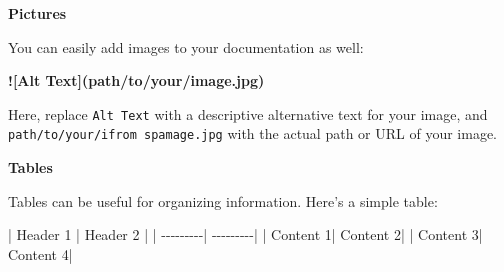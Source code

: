 \documentclass[
  letterpaper,
  DIV=11,
  numbers=noendperiod]{scrreprt}
\newenvironment{Shaded}{}{}
\newcommand{\AlertTok}[1]{\textcolor[rgb]{1.00,0.33,0.33}{\textbf{#1}}}
\newcommand{\NormalTok}[1]{\textcolor[rgb]{0.14,0.16,0.18}{#1}}
\begin{document}
\textbf{Pictures}

You can easily add images to your documentation as well:

\begin{Shaded}
\begin{Highlighting}[]
\AlertTok{![Alt Text](path/to/your/image.jpg)}
\end{Highlighting}
\end{Shaded}

Here, replace \texttt{Alt\ Text} with a descriptive alternative text for
your image, and \texttt{path/to/your/ifrom\ spamage.jpg} with the actual
path or URL of your image.

\textbf{Tables}

Tables can be useful for organizing information. Here's a simple table:

\begin{Shaded}
\begin{Highlighting}[]
\NormalTok{| Header 1 | Header 2 |}
\NormalTok{| {-}{-}{-}{-}{-}{-}{-}{-}{-}| {-}{-}{-}{-}{-}{-}{-}{-}{-}|}
\NormalTok{| Content 1| Content 2|}
\NormalTok{| Content 3| Content 4|}
\end{Highlighting}
\end{Shaded}
\end{document}
